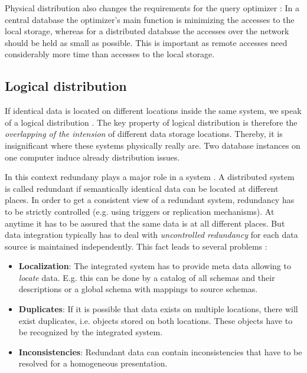 Physical distribution also changes the requirements for the query optimizer \cite[p. 52]{DBLP:books/dp/LeserN2006}: In a central database the optimizer's main function is minimizing  the accesses to the local storage, whereas for a distributed database the accesses over the network should be held as small as possible. This is important as remote accesses need considerably more time than accesses to the local storage.  

\subsection{Logical distribution}
If identical data is located on different locations inside the same system, we speak of a logical distribution \cite[p. 52]{DBLP:books/dp/LeserN2006}. The key property of logical distribution is therefore the \textit{overlapping of the intension} of different data storage locations. Thereby, it is insignificant where these systems physically really are. Two database instances on one computer induce already distribution issues.

In this context redundany plays a major role in a system \cite[p. 53]{DBLP:books/dp/LeserN2006}. A distributed system is called redundant if semantically identical data can be located at different places. In order to get a consistent view of a redundant system, redundancy has to be strictly controlled (e.g. using triggers or replication mechanisms). At anytime it has to be assured that the same data is at all different places. 
But data integration typically has to deal with \textit{uncontrolled redundancy} for each data source is maintained independently. This fact leads to several problems \cite[p. 53]{DBLP:books/dp/LeserN2006}:

\begin{itemize}
\item \textbf{Localization}: The integrated system has to provide meta data allowing to \textit{locate} data. E.g. this can be done by a catalog of all schemas and their descriptions or a global schema with mappings to source schemas.
\item \textbf{Duplicates}: If it is possible that data exists on multiple locations, there will exist duplicates, i.e. objects stored on both locations. These objects have to be recognized by the integrated system.
\item \textbf{Inconsistencies}: Redundant data can contain inconsistencies that have to be resolved for a homogeneous presentation.
\end{itemize}

